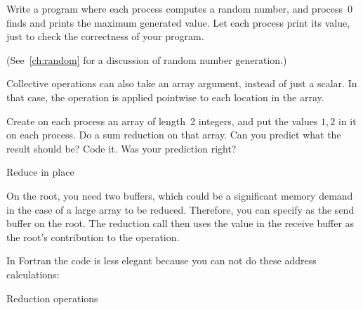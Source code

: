 

\begin{exercise}
  \label{ex:randommax}
  Write a program where each process computes a random number, and process~0
  finds and prints the maximum generated value. Let each process print its value,
  just to check the correctness of your program.
\begin{book}
  (See~\ref{ch:random} for a discussion of random number generation.)
\end{book}
\end{exercise}

Collective operations can also take an array argument, instead of just a scalar.
In that case, the operation is applied pointwise to each location in the array.

\begin{exercise}
  \label{ex:randomcoord}
  Create on each process an array of length~2 integers, and put the
  values $1,2$ in it on each process. Do a sum reduction on that
  array. Can you predict what the result should be?  Code it. Was your
  prediction right?
\end{exercise}

 {Reduce in place}

On the root, 
you need two buffers, which could be a significant memory demand
in the case of a large array to be reduced.
Therefore, you can specify  as the send
buffer on the root. The reduction call then
uses the value in the receive buffer as the root's contribution to the operation.

In Fortran the code is less elegant because you can not do
these address calculations:

 {Reduction operations}
\label{sec:mpi:op-create}

